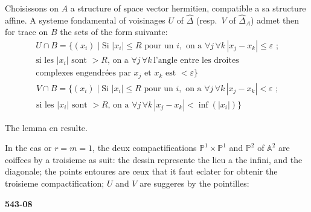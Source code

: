 \documentclass[12pt,a4paper]{article}
\begin{document}
Choisissons on $A$ a structure of space vector hermitien, compatible a sa structure affine. A systeme fondamental of voisinages $U$ of $\widehat{\Delta}$ (resp.\ $V$ of $\widehat{\Delta}_A$) admet then for trace on $B$ the sets of the form suivante:
\begin{multline*}
U \cap B = \{(x_i) \mid \text{Si } |x_i| \leq R \text{ pour un } i, \text{ on a } \forall j\, \forall k\, |x_j - x_k| \leq \varepsilon \text{ ;} \\
\text{si les } |x_i| \text{ sont } > R \text{, on a } \forall j\, \forall k\, \text{l'angle entre les droites} \\
\text{complexes engendrées par } x_j \text{ et } x_k \text{ est } < \varepsilon\}
\end{multline*}
\begin{multline*}
V \cap B = \{(x_i) \mid \text{Si } |x_i| \leq R \text{ pour un } i, \text{ on a } \forall j\, \forall k\, |x_j - x_k| < \varepsilon \text{ ;} \\
\text{si les } |x_i| \text{ sont } > R \text{, on a } \forall j\, \forall k\, |x_j - x_k| < \inf(|x_i|)\}
\end{multline*}

The lemma en resulte.

In the cas or $r = m = 1$, the deux compactifications $\mathbb{P}^1 \times \mathbb{P}^1$ and $\mathbb{P}^2$ of $\mathbb{A}^2$ are coiffees by a troisieme as suit: the dessin represente the lieu a the infini, and the diagonale; the points entoures are ceux that it faut eclater for obtenir the troisieme compactification; $U$ and $V$ are suggeres by the pointilles:

\newpage
\begin{flushright}
\textbf{543-08}
\end{flushright}

\begin{center}
\hspace{1cm}
\end{center}
\end{document}
